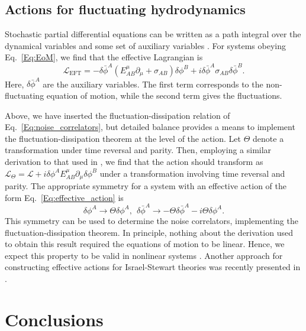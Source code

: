 \documentclass{webofc}
\begin{document}
\subsection{Actions for fluctuating hydrodynamics}

Stochastic partial differential equations can be written as a path integral over the dynamical variables and some set of auxiliary variables \cite{Martin:1973zz}. For systems obeying Eq.\ \eqref{Eq:EoM}, we find that the effective Lagrangian is 
\begin{equation} \label{Eq:effective_action}
    \mathcal{L}_{\mathrm{EFT}} = -\delta \bar{\phi}^A \left( E_{AB}^{\mu} \partial_{\mu} + \sigma_{AB} \right) \delta \phi^B + i \delta \bar{\phi}^A \sigma_{AB} \delta \bar{\phi}^B .
\end{equation}
Here, $\delta \bar{\phi}^A$ are the auxiliary variables. The first term corresponds to the non-fluctuating equation of motion, while the second term gives the fluctuations.

Above, we have inserted the fluctuation-dissipation relation of Eq.\ \eqref{Eq:noise_correlators}, but detailed balance provides a means to implement the fluctuation-dissipation theorem at the level of the action. Let $\Theta$ denote a transformation under time reversal and parity. Then, employing a similar derivation to that used in \cite{Guo:2022ixk}, we find that the action should transform as $\mathcal{L}_{\Theta} = \mathcal{L} + i \delta \phi^A E_{AB}^{\mu} \partial_{\mu} \delta \phi^B$
under a transformation involving time reversal and parity. The appropriate symmetry for a system with an effective action of the form Eq.\ \eqref{Eq:effective_action} is
\begin{equation}
    \delta \phi^A \rightarrow \Theta \delta \phi^A , \:\: \delta \bar{\phi}^A \rightarrow -\Theta \delta \bar{\phi}^A - i \Theta \delta \phi^A .
\end{equation}
This symmetry can be used to determine the noise correlators, implementing the fluctuation-dissipation theorem. In principle, nothing about the derivation used to obtain this result required the equations of motion to be linear. Hence, we expect this property to be valid in nonlinear systems \cite{Huang:2023eyz}. Another approach for constructing effective actions for Israel-Stewart theories was recently presented in \cite{Jain:2023obu}.

\section{Conclusions}
\end{document}
